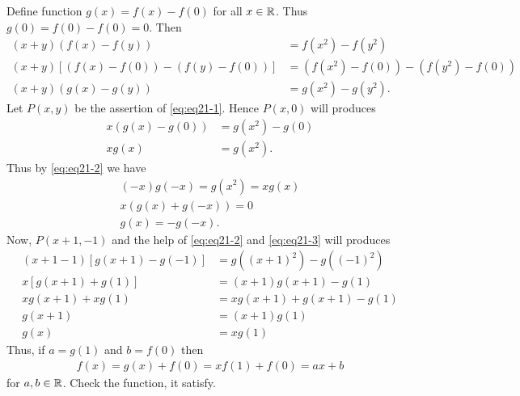 

\begin{solusi}
    Define function $g(x)=f(x)-f(0)$ for all $x \in \mathbb R$. Thus $g(0)=f(0)-f(0)=0$. Then
    \begin{align}
        (x+y)(f(x)-f(y))&=f(x^2)-f(y^2) \nonumber\\
        (x+y)[(f(x)-f(0))-(f(y)-f(0))]&=(f(x^2)-f(0))-(f(y^2)-f(0)) \nonumber\\
        (x+y)(g(x)-g(y)) &= g(x^2)-g(y^2). \label{eq:eq21-1}
    \end{align}
    Let $P(x,y)$ be the assertion of \eqref{eq:eq21-1}. Hence $P(x,0)$ will produces
    \begin{align}
        x(g(x)-g(0)) &= g(x^2)-g(0)\nonumber\\
        xg(x) &= g(x^2). \label{eq:eq21-2}
    \end{align}
    Thus by \eqref{eq:eq21-2} we have
    \begin{align}
        (-x)g(-x) = g(x^2) = xg(x) \nonumber\\
        x(g(x)+g(-x)) = 0 \nonumber\\
        g(x) = -g(-x). \label{eq:eq21-3}
    \end{align}
    Now, $P(x+1,-1)$ and the help of \eqref{eq:eq21-2} and \eqref{eq:eq21-3} will produces
    \begin{align*}
        (x+1-1)[g(x+1)-g(-1)] &= g((x+1)^2)-g((-1)^2)\\
        x[g(x+1)+g(1)] &= (x+1)g(x+1)-g(1)\\
        xg(x+1)+xg(1) &= xg(x+1) + g(x+1) - g(1)\\
        g(x+1) &= (x+1)g(1)\\
        g(x) &= xg(1)
    \end{align*}
    Thus, if $a=g(1)$ and $b=f(0)$ then
    \begin{align*}
        f(x) = g(x)+f(0) = xf(1) + f(0) = ax+b
    \end{align*}
    for $a,b \in \mathbb R$. Check the function, it satisfy.
\end{solusi}